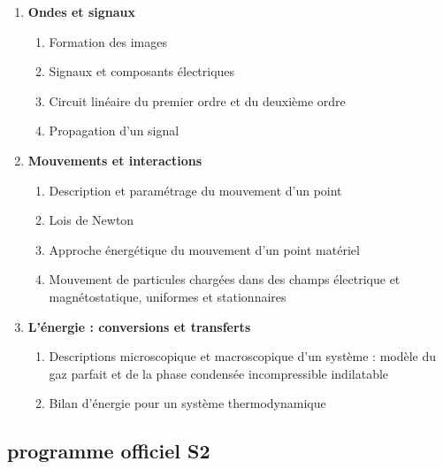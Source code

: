 \documentclass{beamer}
\begin{document}
\begin{frame}
    \begin{enumerate}[label=\textbf{\arabic*.},leftmargin=*]
        \item \textbf{Ondes et signaux}
        \begin{enumerate}[label=1.\arabic*.]
            \item Formation des images
            \item Signaux et composants électriques
            \item Circuit linéaire du premier ordre et du deuxième ordre
            \item Propagation d'un signal
        \end{enumerate}
        \item \textbf{Mouvements et interactions}
        \begin{enumerate}[label=2.\arabic*.]
            \item Description et paramétrage du mouvement d’un point
            \item Lois de Newton
            \item Approche énergétique du mouvement d'un point matériel
            \item Mouvement de particules chargées dans des champs électrique et magnétostatique, uniformes et stationnaires 
        \end{enumerate}
        \item \textbf{L’énergie : conversions et transferts}
        \begin{enumerate}[label=3.\arabic*.]
            \item Descriptions microscopique et macroscopique d’un système : modèle du gaz parfait et de la phase condensée incompressible indilatable
            \item Bilan d’énergie pour un système thermodynamique
        \end{enumerate}    
    \end{enumerate}
\end{frame}

\subsection{programme officiel S2}
\end{document}
